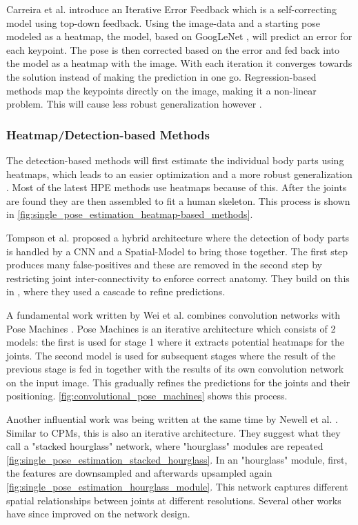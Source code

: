 Carreira et al. \cite{CarreiraAFM15} introduce an Iterative Error Feedback which is a self-correcting model using top-down feedback.
Using the image-data and a starting pose modeled as a heatmap, the model, based on GoogLeNet \cite{googlenet}, will predict an error for each keypoint.
The pose is then corrected based on the error and fed back into the model as a heatmap with the image.
With each iteration it converges towards the solution instead of making the prediction in one go.
Regression-based methods map the keypoints directly on the image, making it a non-linear problem.
This will cause less robust generalization however \cite{Liu2104}.

\subsubsection{Heatmap/Detection-based Methods}
The detection-based methods will first estimate the individual body parts using heatmaps, which leads to an easier optimization and a more robust generalization \cite{chen2022}.
Most of the latest \gls{HPE} methods use heatmaps because of this.
After the joints are found they are then assembled to fit a human skeleton.
This process is shown in \ref{fig:single_pose_estimation_heatmap-based_methods}.

Tompson et al. \cite{TompsonJLB14} proposed a hybrid architecture where the detection of body parts is handled by a \gls{CNN} and a Spatial-Model to bring those together.
The first step produces many false-positives and these are removed in the second step by restricting joint inter-connectivity to enforce correct anatomy.
They build on this in \cite{Tompson2015}, where they used a cascade to refine predictions.

A fundamental work written by Wei et al. \cite{Wei2016} combines convolution networks with Pose Machines \cite{Ramakrishna2014}.
Pose Machines is an iterative architecture which consists of 2 models: the first is used for stage 1 where it extracts potential heatmaps for the joints.
The second model is used for subsequent stages where the result of the previous stage is fed in together with the results of its own convolution network on the input image. 
This gradually refines the predictions for the joints and their positioning.
\ref{fig:convolutional_pose_machines} shows this process.

Another influential work was being written at the same time by Newell et al. \cite{Newell2016}.
Similar to \gls{CPMs}, this is also an iterative architecture.
They suggest what they call a "stacked hourglass" network, where "hourglass" modules are repeated \ref{fig:single_pose_estimation_stacked_hourglass}.
In an "hourglass" module, first, the features are downsampled and afterwards upsampled again \ref{fig:single_pose_estimation_hourglass_module}.
This network captures different spatial relationships between joints at different resolutions.
Several other works \cite{Yang2017}\cite{Yu2017}\cite{Chou17} have since improved on the network design.


